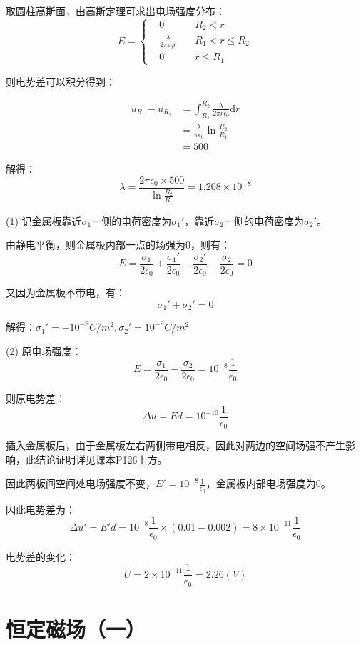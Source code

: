 \documentclass[b5paper,opensource,sourcefont,parskip]{qyxf-book}
\newcommand{\di}[1]{\mathrm{d}#1}
\begin{document}

\solve 取圆柱高斯面，由高斯定理可求出电场强度分布：
\begin{equation}
E=\left\{
\begin{aligned}
&0\quad &R_2<r\\
&\frac{\lambda}{2\pi\epsilon_0 r}\quad &R_1<r\leqslant R_2\\
&0	&r\leqslant R_1
\end{aligned}
\right.
\end{equation}

则电势差可以积分得到：

\begin{align*}
u_{R_1}-u_{R_2}&=\int_{R_1}^{R_2} \frac{\lambda}{2\pi r\epsilon_0} \di{r}\\
&=\frac{\lambda}{\pi\epsilon_0}\ln\frac{R_2}{R_1}\\
&=500
\end{align*}


解得：
\[\lambda=\frac{2\pi\epsilon_0\times 500}{\ln\frac{R_2}{R_1}}=1.208\times 10^{-8}\]


\solve 
(1) 记金属板靠近$ \sigma_1 $一侧的电荷密度为$ \sigma_1' $，靠近$ \sigma_2 $一侧的电荷密度为$ \sigma_2' $。

由静电平衡，则金属板内部一点的场强为$ 0 $，则有：
\[E=\frac{\sigma_1}{2\epsilon_0}+\frac{\sigma_1'}{2\epsilon_0}-\frac{\sigma_2'}{2\epsilon_0}-\frac{\sigma_2}{2\epsilon_0}=0\]

又因为金属板不带电，有：
\[\sigma_1'+\sigma_2'=0\]

解得：$\sigma_1'=-10^{-8}C/m^2,\sigma_2'=10^{-8}C/m^2$

(2) 原电场强度：
\[E=\frac{\sigma_1}{2\epsilon_0}-\frac{\sigma_2}{2\epsilon_0}=10^{-8}\frac{1}{\epsilon_0}\]

则原电势差：
\[\Delta u=Ed=10^{-10}\frac{1}{\epsilon_0}\]

插入金属板后，由于金属板左右两侧带电相反，因此对两边的空间场强不产生影响，此结论证明详见课本P126上方。

因此两板间空间处电场强度不变，$ E'=10^{-8}\frac{1}{\epsilon_0} $，金属板内部电场强度为$ 0 $。

因此电势差为：
\[\Delta u'=E'd=10^{-8}\frac{1}{\epsilon_0}\times(0.01-0.002)=8\times 10^{-11}\frac{1}{\epsilon_0}\]

电势差的变化：
\[U=2\times10^{-11}\frac{1}{\epsilon_0}=2.26(V)\]

\chapter{恒定磁场（一）}  %
\end{document}
